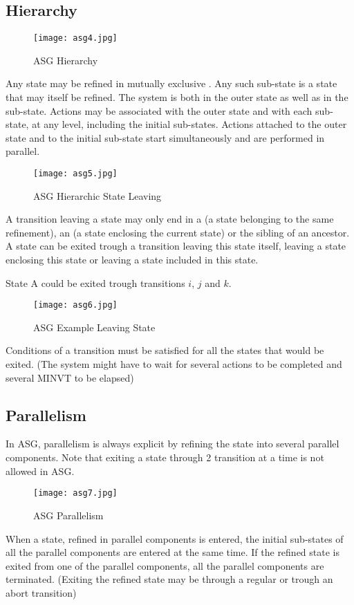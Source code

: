 \documentclass[../main.tex]{subfiles}
\begin{document}
\subsection{Hierarchy}
\begin{figure}[H]
    \centering
    \texttt{[image: asg4.jpg]}
    \caption{ASG Hierarchy}
    \label{asg4}
\end{figure}
Any state may be refined in mutually exclusive .
Any such sub-state is a state that may itself be refined.
The system is both in the outer state as well as in the sub-state.
Actions may be associated with the outer state and with each sub-state, at any level, including the initial sub-states.
Actions attached to the outer state and to the initial sub-state start simultaneously and are performed in parallel.
\begin{figure}[H]
    \centering
    \texttt{[image: asg5.jpg]}
    \caption{ASG Hierarchic State Leaving}
    \label{asg5}
\end{figure}
A transition leaving a state may only end in a  (a state belonging to the same refinement), an  (a state enclosing the current state) or the sibling of an ancestor.
A state can be exited trough a transition leaving this state itself, leaving a state enclosing this state or leaving a state included in this state.
\begin{exmp}
State A could be exited trough transitions $i$, $j$ and $k$.
\begin{figure}[H]
    \centering
    \texttt{[image: asg6.jpg]}
    \caption{ASG Example Leaving State}
    \label{asg6}
\end{figure}
\end{exmp}
Conditions of a transition must be satisfied for all the states that would be exited.
(The system might have to wait for several actions to be completed and several MINVT to be elapsed)

\subsection{Parallelism}
In ASG, parallelism is always explicit by refining the state into several parallel components. Note that exiting a state through 2 transition at a time is not allowed in ASG.

\begin{figure}[H]
    \centering
    \texttt{[image: asg7.jpg]}
    \caption{ASG Parallelism}
    \label{asg6}
\end{figure}
When a state, refined in parallel components is entered, the initial sub-states of all the parallel components are entered at the same time.
If the refined state is exited from one of the parallel components, all the parallel components are terminated.
(Exiting the refined state may be through a regular or trough an abort transition)
\end{document}
